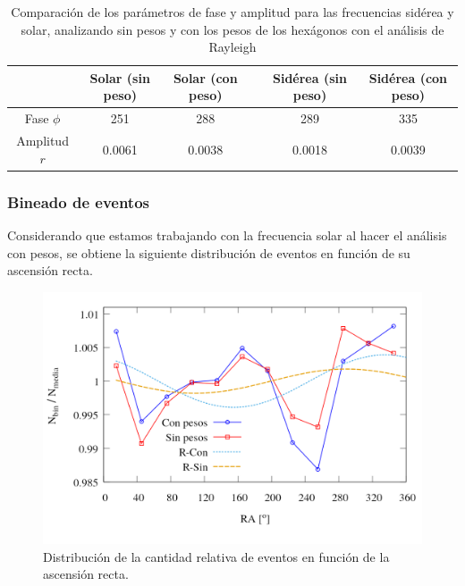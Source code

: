 		
		\begin{table}[H]
		\centering
		\begin{tabular}{c|c|c|c|c|c}
					& Solar (sin peso)	& Solar (con peso)	&& Sidérea (sin peso) 	& Sidérea (con peso)	 \\ \hline
		Fase $\phi$ & 251	    		& 288	    		&& 289				& 335				\\
		Amplitud $r$& 0.0061	    	& 0.0038	  		&&0.0018		& 0.0039			\\
		\end{tabular}
		\caption{Comparación de los parámetros de fase y amplitud para las frecuencias sidérea y solar, analizando sin pesos y con los pesos de los hexágonos con el análisis de Rayleigh}
		\end{table}


\subsubsection{Bineado de eventos }


Considerando que estamos trabajando con la frecuencia solar al hacer el análisis con pesos, se obtiene la siguiente distribución de eventos en función de su ascensión recta.
\begin{figure}[H]
	\centering
	\includegraphics[width=\linewidth]{eventos_clasificados_por_RA_v4.png}
	\caption{Distribución de la cantidad relativa de eventos en función de la ascensión recta.}
\end{figure}

		


